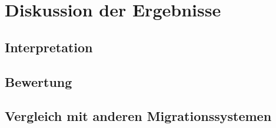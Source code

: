 \chapter{Diskussion der Ergebnisse}
    \label{chapter:FindingsDiscussion}
    \section{Interpretation}
        \label{section:findingsInterpretation}
    \section{Bewertung}
    \section{Vergleich mit anderen Migrationssystemen}
